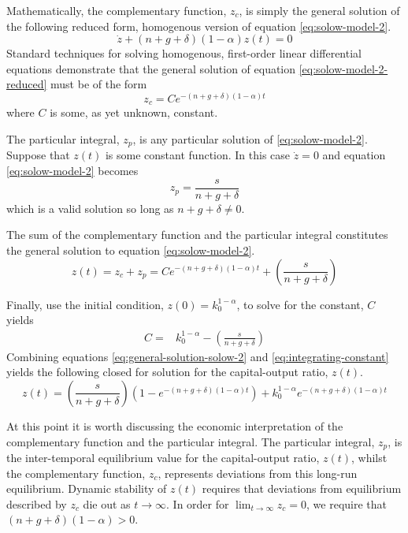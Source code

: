 \documentclass[11pt]{article}
\begin{document}
Mathematically, the complementary function, $z_c$, is simply the general solution of the following reduced form, homogenous version of equation \ref{eq:solow-model-2}.
\begin{equation}\label{eq:solow-model-2-reduced}
	\dot{z} + (n + g + \delta) (1-\alpha) z(t) = 0 
\end{equation}
Standard techniques for solving homogenous, first-order linear differential equations demonstrate that the general solution of equation \ref{eq:solow-model-2-reduced} must be of the form
\begin{equation}
	z_c = Ce^{-(n + g + \delta)(1-\alpha)t}
\end{equation}
where $C$ is some, as yet unknown, constant.

The particular integral, $z_p$, is any particular solution of \ref{eq:solow-model-2}.  Suppose that $z(t)$ is some constant function. In this case $\dot{z}=0$ and equation \ref{eq:solow-model-2} becomes
\begin{equation}
	z_p = \frac{s}{n+g+\delta}
\end{equation}
which is a valid solution so long as $n + g + \delta \neq 0$.

The sum of the complementary function and the particular integral constitutes the general solution to equation \ref{eq:solow-model-2}.
\begin{equation}\label{eq:general-solution-solow-2}
	z(t) = z_c + z_p =  Ce^{-(n + g + \delta)(1-\alpha)t} + \left(\frac{s}{n+g+\delta}\right)
\end{equation}

Finally, use the initial condition, $z(0) = k_0^{1-\alpha}$, to solve for the constant, $C$ yields
\begin{align}\label{eq:integrating-constant}
	C =& k_0^{1-\alpha} - \left(\frac{s}{n+g+\delta}\right)
\end{align}
Combining equations \ref{eq:general-solution-solow-2} and \ref{eq:integrating-constant} yields the following closed for solution for the capital-output ratio, $z(t)$.
\begin{equation}
	z(t)= \left(\frac{s}{n+g+\delta}\right)\left(1 -  e^{-(n + g + \delta) (1-\alpha) t}\right) + k_0^{1-\alpha}e^{-(n + g + \delta) (1-\alpha) t}
\end{equation} 

At this point it is worth discussing the economic interpretation of the complementary function and the particular integral.  The particular integral, $z_p$, is the inter-temporal equilibrium value for the capital-output ratio, $z(t)$, whilst the complementary function,  $z_c$, represents deviations from this long-run equilibrium.  Dynamic stability of $z(t)$ requires that deviations from equilibrium described by $z_c$ die out as $t\rightarrow\infty$.  In order for $\lim_{t\rightarrow\infty} z_c = 0$, we require that $(n + g + \delta)(1-\alpha) > 0$.



\end{document}
